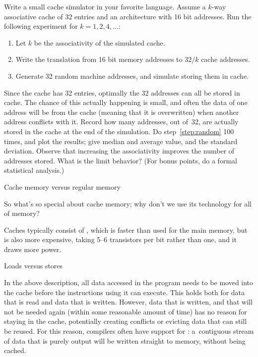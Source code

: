 \begin{exercise}
  Write a small cache simulator in your favorite language. Assume a
  $k$-way associative cache of 32 entries and an architecture with 16
  bit addresses. Run the following
  experiment for $k=1,2,4,\ldots$:
  \begin{enumerate}
  \item Let $k$ be the associativity of the simulated cache.
  \item Write the translation from 16 bit memory addresses to $32/k$ 
    cache addresses.
  \item\label{step:random} Generate 32 random machine addresses, and
    simulate storing them in cache.
  \end{enumerate}
  Since the cache has 32 entries, optimally the 32 addresses can all
  be stored in cache. The chance of this actually happening is small,
  and often the data of one address will be  from the cache
  (meaning that it is overwritten) when another address conflicts with
  it. Record how many addresses, out of~32, are actually stored in the
  cache at the end of the simulation. Do step~\ref{step:random} 100
  times, and plot the results; give median and average value, and the
  standard deviation. Observe that increasing the associativity
  improves the number of addresses stored. What is the limit
  behavior? (For bonus points, do a formal statistical analysis.)
\end{exercise}


 {Cache memory versus regular memory}

So what's so special about cache memory; why don't we use its
technology for all of memory?

Caches typically
consist of , which is faster than 
used for the main memory, but is also more expensive, taking 5--6
transistors per bit rather than one, and it draws more power.

 {Loads versus stores}

In the above description, all data accessed in the program needs to be
moved into the cache before the instructions using it can
execute. This holds both for data that is read and data that is
written. However, data that is written, and that will not be needed
again (within some reasonable amount of time) has no reason for
staying in the cache, potentially creating conflicts or evicting data
that can still be reused. For this reason, compilers often have
support for : a~contiguous stream of
data that is purely output will be written straight to memory, without
being cached.

